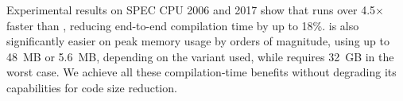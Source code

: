 Experimental results on SPEC CPU 2006 and 2017 show that {\ProjName} runs over 4.5$\times$ faster than {\SOAName}, reducing end-to-end compilation time by up to 18\%.
{\ProjName} is also significantly easier on peak memory usage by orders of magnitude, using up to 48~MB or 5.6~MB, depending on the variant used, while {\SOAName} requires 32~GB in the worst case.
We achieve all these compilation-time benefits without degrading its capabilities for code size reduction.